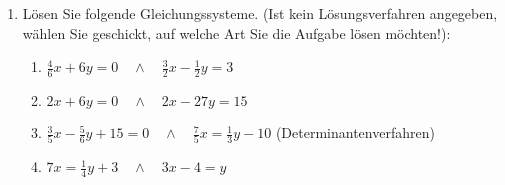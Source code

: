 \documentclass{scrartcl}
\begin{document}
		
	\begin{enumerate}
		\item Lösen Sie folgende Gleichungssysteme. (Ist kein Lösungsverfahren angegeben, wählen Sie geschickt, auf welche Art Sie die Aufgabe lösen möchten!):
			\begin{enumerate}
				\item $ \frac{4}{6}x + 6y = 0 \quad \wedge \quad \frac{3}{2}x - \frac{1}{2}y =3$
				\item $ 2x + 6y = 0 \quad \wedge \quad 2x - 27y =15$
				\item $ \frac{3}{5}x - \frac{5}{6} y + 15= 0 \quad \wedge \quad \frac{7}{5}x = \frac{1}{3}y -10$ \quad (Determinantenverfahren)
				\item $7x = \frac{1}{4}y +3 \quad \wedge \quad 3x -4 = y$
				 \\
			\end{enumerate}
			
			
	\end{enumerate} 
	
	
\end{document}
